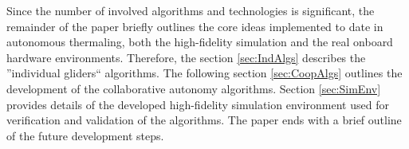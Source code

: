 \documentclass{ifacconf}
\begin{document}

Since the number of involved algorithms and technologies is significant, the remainder of
the paper briefly outlines the core ideas implemented to date in autonomous thermaling,
both the high-fidelity simulation and the real onboard hardware environments. Therefore,
the section \ref{sec:IndAlgs} describes the ''individual gliders`` algorithms. The
following section \ref{sec:CoopAlgs}  outlines the development of the collaborative
autonomy algorithms. Section \ref{sec:SimEnv} provides details of the developed
high-fidelity simulation environment used for verification and validation of the
algorithms. The paper ends with a brief outline of the future development steps.
\end{document}
